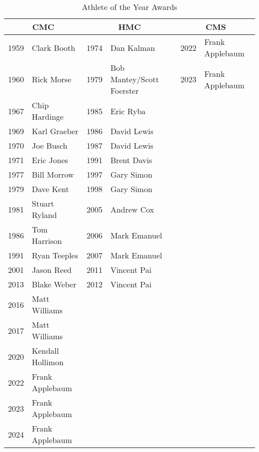             \begin{table}[htbp]
                \centering
                \footnotesize
                \caption*{Athlete of the Year Awards}
                \begin{tabular}{c l | c l | c l}
                \toprule
                \multicolumn{2}{c|}{\textbf{CMC}} & \multicolumn{2}{c|}{\textbf{HMC}} & \multicolumn{2}{c}{\textbf{CMS}} \\
                \midrule
                1959 & Clark Booth & 1974 & Dan Kalman & 2022 & Frank Applebaum \\
                1960 & Rick Morse & 1979 & Bob Mantey/Scott Foerster & 2023 & Frank Applebaum \\
                1967 & Chip Hardinge & 1985 & Eric Ryba & & \\
                1969 & Karl Graeber & 1986 & David Lewis & & \\
                1970 & Joe Busch & 1987 & David Lewis & & \\
                1971 & Eric Jones & 1991 & Brent Davis & & \\
                1977 & Bill Morrow & 1997 & Gary Simon & & \\
                1979 & Dave Kent & 1998 & Gary Simon & & \\
                1981 & Stuart Ryland & 2005 & Andrew Cox & & \\
                1986 & Tom Harrison & 2006 & Mark Emanuel & & \\
                1991 & Ryan Teeples & 2007 & Mark Emanuel & & \\
                2001 & Jason Reed & 2011 & Vincent Pai & & \\
                2013 & Blake Weber & 2012 & Vincent Pai & & \\
                2016 & Matt Williams & & & & \\
                2017 & Matt Williams & & & & \\
                2020 & Kendall Hollimon & & & & \\
                2022 & Frank Applebaum & & & & \\
                2023 & Frank Applebaum & & & & \\
                2024 & Frank Applebaum & & & & \\
                \bottomrule
                \end{tabular}
            \end{table}

